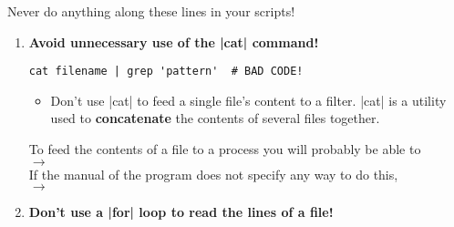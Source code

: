 \begin{frame}[fragile]{Never do anything along these lines in your scripts!}
\begin{enumerate}
\begin{lstlisting}[style=MyBash, numbers=none, aboveskip=2mm, xrightmargin=15mm]
                ls *.txt | grep 'story'            # ALSO BAD CODE!
            \end{lstlisting}
            \begin{itemize}
                \item Unless your \bash|grep| pattern is really smart it will probably not be trustworthy
                \item In the first example above, the test would match both \texttt{story.txt} \textbf{and} \texttt{story.txt.exe}!
                \item If you make \bash|grep| patterns that are smart enough, they'll probably be so ugly, massive and unreadable that you shouldn't use them anyway!
            \end{itemize}
            \\
            Bash has a feature called \textbf{Pathname Expansion}.
            This will help you enumerate all files that match a certain pattern.
            Also, you can use globs to test whether a filename matches a certain glob pattern.
        \item<only@3>
            \alert{\large\textbf{Avoid unnecessary use of the \bash|cat| command!}}
            \begin{lstlisting}[style=MyBash, numbers=none, aboveskip=2mm, xrightmargin=35mm]
                cat filename | grep 'pattern'  # BAD CODE!
            \end{lstlisting}
            \begin{itemize}
                \item Don't use \bash|cat| to feed a single file's content to a filter.
                      \bash|cat| is a utility used to \textbf{concatenate} the contents of several files together.
            \end{itemize}
            To feed the contents of a file to a process you will probably be able to\\ $\to\;$\\
            If the manual of the program does not specify any way to do this,\\ $\to\;$
        \item<only@3>
            \alert{\large\textbf{Don't use a \bash|for| loop to read the lines of a file!}}
            \begin{lstlisting}[style=MyBash, numbers=none, aboveskip=2mm, xrightmargin=35mm]

\end{lstlisting}
\end{enumerate}
\end{frame}
